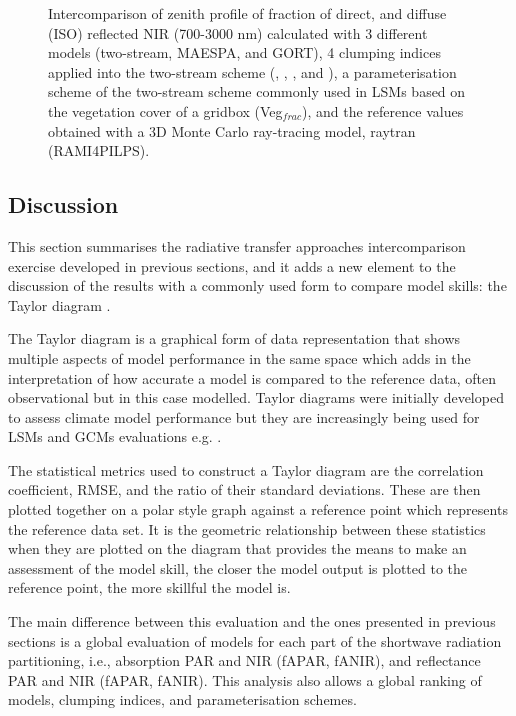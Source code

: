 \documentclass[a4paper,11pt]{report}
\begin{document}
\begin{figure}
\begin{tabular}{lll}
\end{tabular}
\caption{Intercomparison of zenith profile of fraction of direct, and diffuse (ISO) reflected NIR (700-3000 nm) calculated with 3 different models (two-stream, MAESPA, and GORT), 4 clumping indices applied into the two-stream scheme (\citet{Nilson1971}, \citet{Kucharik1999}, \citet{pinty2006}, and \citet{Ni-Meister2010}), a parameterisation scheme of the two-stream scheme commonly used in LSMs based on the vegetation cover of a gridbox (Veg$_{frac}$), and the reference values obtained with a 3D Monte Carlo ray-tracing model, raytran (RAMI4PILPS).}
\label{f:szacomparisonalbNIR}
\end{figure}

\subsection{Discussion}

This section summarises the radiative transfer approaches intercomparison exercise developed in previous sections, and it adds a new element to the discussion of the results with a commonly used form to compare model skills: the Taylor diagram \citep{Taylor2001}.

The Taylor diagram is a graphical form of data representation that shows multiple aspects of model performance in the same space which adds in the interpretation of how accurate a model is compared to the reference data, often observational but in this case modelled. Taylor diagrams were initially developed to assess climate model performance but they are increasingly being used for LSMs and GCMs evaluations e.g. \citet{poulter2011,Stockli2011,Anav2015}.

The statistical metrics used to construct a Taylor diagram are the correlation coefficient, RMSE, and the ratio of their standard deviations. These are then plotted together on a polar style graph against a reference point which represents the reference data set. It is the geometric relationship between these statistics when they are plotted on the diagram that provides the means to make an assessment of the model skill, the closer the model output is plotted to the reference point, the more skillful the model is.

The main difference between this evaluation and the ones presented in previous sections is a global evaluation of models for each part of the shortwave radiation partitioning, i.e., absorption PAR and NIR (fAPAR, fANIR), and reflectance PAR and NIR (fAPAR, fANIR). This analysis also allows a global ranking of models, clumping indices, and parameterisation schemes.
\end{document}

